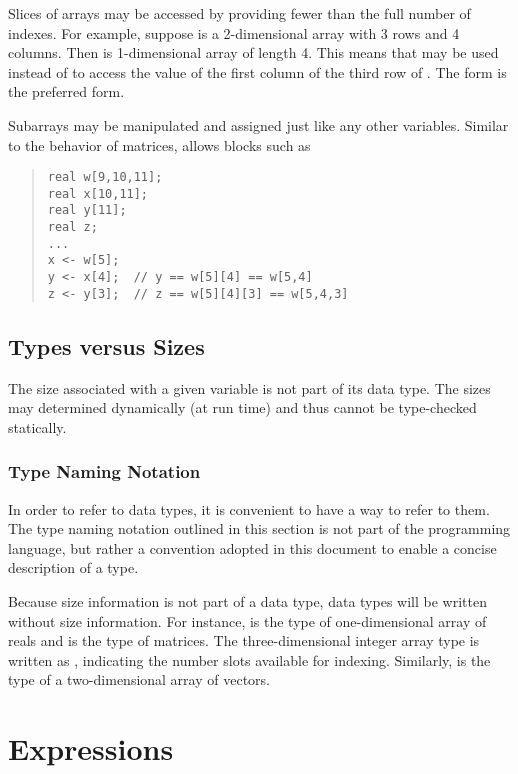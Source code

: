 Slices of arrays may be accessed by providing fewer than the full
number of indexes.  For example, suppose  is a 2-dimensional
array with 3 rows and 4 columns.  Then  is 1-dimensional
array of length 4.  This means that  may be used instead
of  to access the value of the first column of the third
row of .  The form  is the preferred form.

Subarrays may be manipulated and assigned just like any other
variables.  Similar to the behavior of matrices, \Stan allows blocks
such as 
%
\begin{quote}
\begin{Verbatim} 
real w[9,10,11];
real x[10,11];
real y[11];
real z;
...
x <- w[5];
y <- x[4];  // y == w[5][4] == w[5,4]
z <- y[3];  // z == w[5][4][3] == w[5,4,3]
\end{Verbatim}
\end{quote}
%

\section{Types versus Sizes}

The size associated with a given variable is not part of its data
type.  The sizes may determined dynamically (at run time) and thus
cannot be type-checked statically.  

\subsection{Type Naming Notation}

In order to refer to data types, it is convenient to have a way to
refer to them.  The type naming notation outlined in this section is
not part of the \Stan programming language, but rather a convention
adopted in this document to enable a concise description of a type.

Because size information is not part of a data type, data
types will be written without size information.  For instance,
 is the type of one-dimensional array of reals and
 is the type of matrices.  The three-dimensional integer
array type is written as , indicating the number slots
available for indexing.  Similarly,  is the type of a
two-dimensional array of vectors.





\chapter{Expressions}

